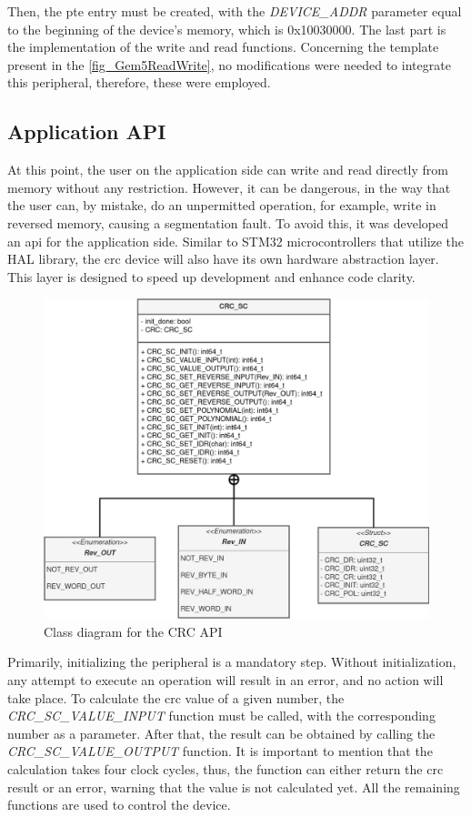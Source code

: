 Then, the \gls{pte} entry must be created, with the \textit{DEVICE\_ADDR} \space parameter equal to the beginning of the device's memory, which 
is 0x10030000. The last part is the implementation of the write and read functions. Concerning the 
template present in the \autoref{fig_Gem5ReadWrite}, no modifications were needed to integrate this peripheral, therefore, these were employed. 

\subsection{Application API}

At this point, the user on the application side can write and read directly from memory without any restriction. However, it can be
dangerous, in the way that the user can, by mistake, do an unpermitted operation, for example, write in reversed memory, causing a
segmentation fault. To avoid this, it was developed an \gls{api} for the application side. Similar to STM32 microcontrollers that 
utilize the HAL library, the \gls{crc} device will also have its own hardware abstraction layer. This layer is designed to speed up 
development and enhance code clarity.

\begin{figure}[H]
	\centering
 	\includegraphics[width=0.7\linewidth]{Images/CRC_API_Class_Diagram.png} 
 	\caption{Class diagram for the CRC API}
\end{figure}

Primarily, initializing the peripheral is a mandatory step. Without initialization, any attempt to execute an operation will 
result in an error, and no action will take place. To calculate the \gls{crc} value of a given number, the \textit{CRC\_SC\_VALUE\_INPUT} \space
function must be called, with the corresponding number as a parameter. After that, the result can be obtained by calling the 
\textit{CRC\_SC\_VALUE\_OUTPUT} \space function. It is important to mention that the calculation takes four clock cycles, thus, the function can 
either return the \gls{crc} result or an error, warning that the value is not calculated yet. All the remaining functions are used to
control the device.

